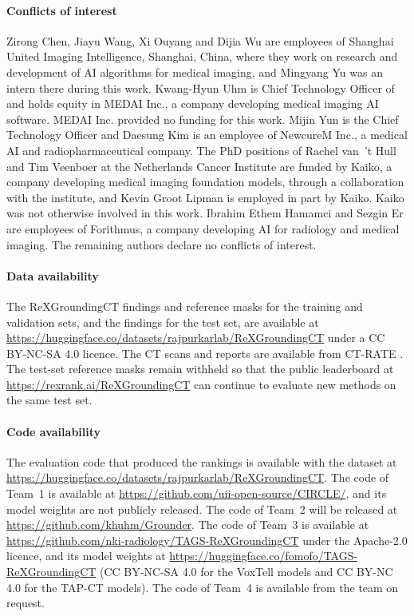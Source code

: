 \documentclass[final,5p,times,twocolumn,authoryear,numafflabel]{elsarticle}
\begin{document}
\paragraph{Conflicts of interest} Zirong Chen, Jiayu Wang, Xi Ouyang and Dijia
Wu are employees of Shanghai United Imaging Intelligence, Shanghai, China,
where they work on research and development of AI algorithms for medical
imaging, and Mingyang Yu was an intern there during this work. Kwang-Hyun Uhm is Chief Technology Officer
of and holds equity in MEDAI Inc., a company developing medical imaging AI
software. MEDAI Inc. provided no funding for this work. Mijin Yun is the Chief
Technology Officer and Daesung Kim is an employee of NewcureM Inc., a medical AI
and radiopharmaceutical company. The PhD positions of Rachel van~'t
Hull and Tim Veenboer at the Netherlands Cancer Institute are funded by Kaiko,
a company developing medical imaging foundation models, through a collaboration
with the institute, and Kevin Groot Lipman is employed in part by Kaiko. Kaiko
was not otherwise involved in this work. Ibrahim Ethem Hamamci and Sezgin Er are
employees of Forithmus, a company developing AI for radiology and medical imaging. The remaining authors declare no
conflicts of interest.
\paragraph{Data availability} The ReXGroundingCT findings and reference masks
for the training and validation sets, and the findings for the test set, are
available at
\url{https://huggingface.co/datasets/rajpurkarlab/ReXGroundingCT} under a
CC BY-NC-SA 4.0 licence. The CT scans and reports are available from CT-RATE
\citep{hamamci2026generalist}. The test-set reference masks remain withheld so
that the public leaderboard at \url{https://rexrank.ai/ReXGroundingCT} can
continue to evaluate new methods on the same test set.
\paragraph{Code availability} The evaluation code that produced the rankings
is available with the dataset at
\url{https://huggingface.co/datasets/rajpurkarlab/ReXGroundingCT}. The code of
Team~1 is
available at \url{https://github.com/uii-open-source/CIRCLE/}, and its model
weights are not publicly released. The code of Team~2 will be released at
\url{https://github.com/khuhm/Grounder}. The code of Team~3 is available at
\url{https://github.com/nki-radiology/TAGS-ReXGroundingCT} under the Apache-2.0
licence, and its model weights at
\url{https://huggingface.co/fomofo/TAGS-ReXGroundingCT} (CC BY-NC-SA 4.0 for the
VoxTell models and CC BY-NC 4.0 for the TAP-CT models). The code of Team~4 is
available from the team on request.
\end{document}
